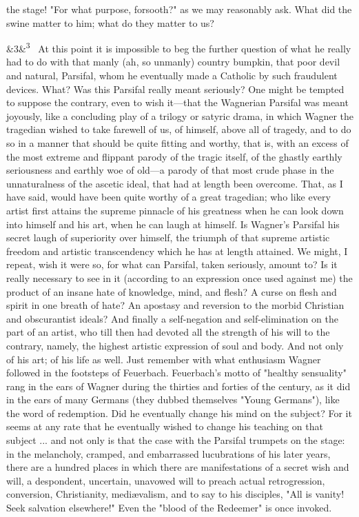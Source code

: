 \documentclass[12pt]{article}
\newcommand{\para}[1][]{\par\noindent\ifx&#1&\else\textsuperscript{\footnotesize #1}~\fi}
\begin{document}
the stage! "For what purpose, forsooth?" as we may reasonably ask. What did the swine matter to him; what do they matter to us?

\para[3] At this point it is impossible to beg the further question of what he really had to do with that manly (ah, so unmanly) country bumpkin, that poor devil and natural, Parsifal, whom he eventually made a Catholic by such fraudulent devices. What? Was this Parsifal really meant seriously? One might be tempted to suppose the contrary, even to wish it---that the Wagnerian Parsifal was meant joyously, like a concluding play of a trilogy or satyric drama, in which Wagner the tragedian wished to take farewell of us, of himself, above all of tragedy, and to do so in a manner that should be quite fitting and worthy, that is, with an excess of the most extreme and flippant parody of the tragic itself, of the ghastly earthly seriousness and earthly woe of old---a parody of that most crude phase in the unnaturalness of the ascetic ideal, that had at length been overcome. That, as I have said, would have been quite worthy of a great tragedian; who like every artist first attains the supreme pinnacle of his greatness when he can look down into himself and his art, when he can laugh at himself. Is Wagner's Parsifal his secret laugh of superiority over himself, the triumph of that supreme artistic freedom and artistic transcendency which he has at length attained. We might, I repeat, wish it were so, for what can Parsifal, taken seriously, amount to? Is it really necessary to see in it (according to an expression once used against me) the product of an insane hate of knowledge, mind, and flesh? A curse on flesh and spirit in one breath of hate? An apostasy and reversion to the morbid Christian and obscurantist ideals? And finally a self-negation and self-elimination on the part of an artist, who till then had devoted all the strength of his will to the contrary, namely, the highest artistic expression of soul and body. And not only of his art; of his life as well. Just remember with what enthusiasm Wagner followed in the footsteps of Feuerbach. Feuerbach's motto of "healthy sensuality" rang in the ears of Wagner during the thirties and forties of the century, as it did in the ears of many Germans (they dubbed themselves "Young Germans"), like the word of redemption. Did he eventually change his mind on the subject? For it seems at any rate that he eventually wished to change his teaching on that subject ... and not only is that the case with the Parsifal trumpets on the stage: in the melancholy, cramped, and embarrassed lucubrations of his later years, there are a hundred places in which there are manifestations of a secret wish and will, a despondent, uncertain, unavowed will to preach actual retrogression, conversion, Christianity, mediævalism, and to say to his disciples, "All is vanity! Seek salvation elsewhere!" Even the "blood of the Redeemer" is once invoked.
\end{document}

